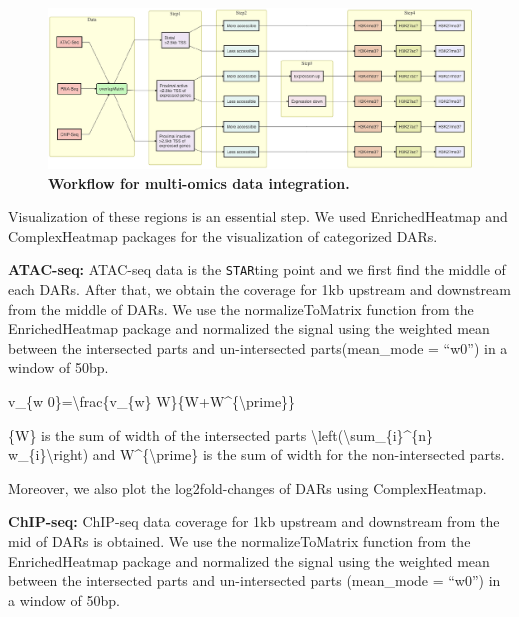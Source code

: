 \documentclass[12pt,twoside]{reedthesis}
\begin{document}
\newpage
\begin{landscape}


\begin{figure}[H]

{\centering \includegraphics{thesis_files/figure-latex/mf8-1} 

}

\caption[Workflow for multi-omics data integration]{\textbf{Workflow for multi-omics data integration.}}\label{fig:mf8}
\end{figure}
\end{landscape}
Visualization of these regions is an essential step. We used
EnrichedHeatmap and ComplexHeatmap packages for the visualization of
categorized DARs.

\textbf{ATAC-seq:} ATAC-seq data is the \texttt{STAR}ting point and we first find the
middle of each DARs. After that, we obtain the coverage for 1kb upstream
and downstream from the middle of DARs. We use the normalizeToMatrix
function from the EnrichedHeatmap package and normalized the signal
using the weighted mean between the intersected parts and un-intersected
parts(mean\_mode = ``w0'') in a window of 50bp.

v\_\{w 0\}=\textbackslash frac\{v\_\{w\} W\}\{W+W\^{}\{\textbackslash prime\}\}

\{W\} is the sum of width of the intersected parts \textbackslash left(\textbackslash sum\_\{i\}\^{}\{n\}
w\_\{i\}\textbackslash right) and W\^{}\{\textbackslash prime\} is the sum of width for the
non-intersected parts.

Moreover, we also plot the log2fold-changes of DARs using
ComplexHeatmap.

\textbf{ChIP-seq:} ChIP-seq data coverage for 1kb upstream and downstream from
the mid of DARs is obtained. We use the normalizeToMatrix function from
the EnrichedHeatmap package and normalized the signal using the weighted
mean between the intersected parts and un-intersected parts (mean\_mode =
``w0'') in a window of 50bp.
\end{document}
